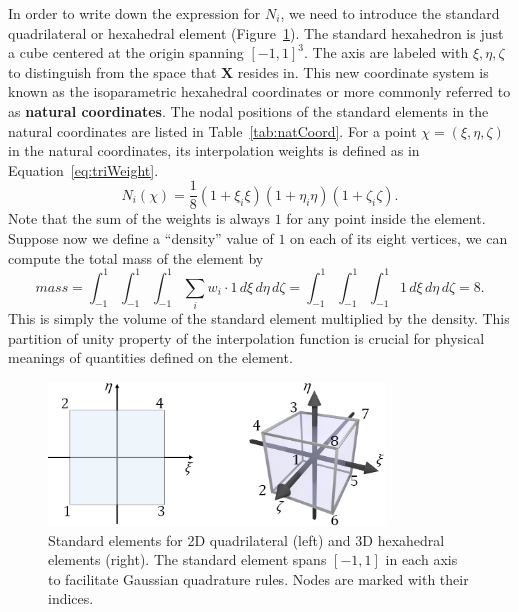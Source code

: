 In order to write down the expression for $N_i$, we need to introduce the standard quadrilateral or hexahedral element (Figure~\ref{fig:standardEle}).
The standard hexahedron is just a cube centered at the origin spanning $[-1,1]^3$.
The axis are labeled with $\xi, \eta, \zeta$ to distinguish from the space that $\mathbf{X}$ resides in.
This new coordinate system is known as the isoparametric hexahedral coordinates or more commonly referred to as \textbf{natural coordinates}.
The nodal positions of the standard elements in the natural coordinates are listed in Table~\ref{tab:natCoord}.
For a point $\chi=(\xi, \eta,\zeta)$ in the natural coordinates,
its interpolation weights is defined as in Equation~\ref{eq:triWeight}.
\begin{equation}
	N_i(\chi)=\frac{1}{8}(1+\xi_i\xi)(1+\eta_i\eta)(1+\zeta_i\zeta).
	\label{eq:triWeight}
\end{equation}
Note that the sum of the weights is always $1$ for any point inside the element.
Suppose now we define a ``density'' value of $1$ on each of its eight vertices,
we can compute the total mass of the element by 
\[
mass=\int_{-1}^{1}\int_{-1}^{1}\int_{-1}^{1}\sum_i w_i\cdot 1 \,d\xi \,d\eta\,d\zeta=
\int_{-1}^{1}\int_{-1}^{1}\int_{-1}^{1} 1 \,d\xi \,d\eta\,d\zeta=8.
\]
This is simply the volume of the standard element multiplied by the density.
This partition of unity property of the interpolation function is crucial for physical meanings of quantities defined on the element.
\begin{figure}
\centering
\includegraphics[width=0.8\textwidth]{figs/refEle.png}
\caption{Standard elements for 2D quadrilateral (left) 
	and 3D hexahedral elements (right). The standard element spans $[-1,1]$ in each axis
	to facilitate Gaussian quadrature rules. Nodes are marked with their indices.
	}
\label{fig:standardEle}
\end{figure}
